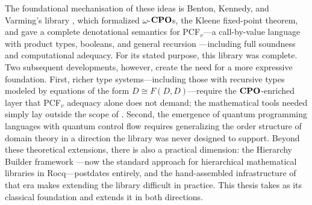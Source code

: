 The foundational mechanisation of these ideas is Benton, Kennedy, and Varming's \Rocq{} library \cite{BKV2009}, which formalized
$\omega$-$\mathbf{CPO}$s, the Kleene fixed-point theorem, and gave a complete denotational semantics for PCF$_v$---a call-by-value language with product types, booleans, and general recursion ---including full soundness and computational adequacy. For its stated purpose,
this library was complete. Two subsequent developments, however, create the need for a more expressive foundation. First, richer
type systems---including those with recursive types modeled by equations of the form $D \cong F(D, D)$---require the $\mathbf{CPO}$-enriched 
layer that PCF$_v$ adequacy alone does not demand; the mathematical tools needed simply lay outside the scope of \cite{BKV2009}. Second,
the emergence of quantum programming languages with quantum control flow requires generalizing the order structure of domain theory
in a direction the library was never designed to support. Beyond these theoretical extensions, there is also a practical dimension: 
the Hierarchy Builder framework \cite{HB2023}---now the standard approach for hierarchical mathematical libraries in Rocq---postdates 
\cite{BKV2009} entirely, and the hand-assembled infrastructure of that era makes extending the library difficult in practice. 
This thesis takes \cite{BKV2009} as its classical foundation and extends it in both directions.

